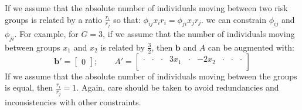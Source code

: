 If we assume that
the absolute number of individuals moving between two risk groups is
related by a ratio $\frac{r_i}{r_j}$ so that:
$\phi_{ij} x_{i} r_{i} = \phi_{ji} x_{j} r_{j}$. we can
constrain $\phi_{ij}$ and $\phi_{ji}$.				%
For example, for $G = 3$,
if we assume that the number of individuals moving between groups $x_1$ and $x_2$
is related by $\frac{3}{2}$,
then $\bm{b}$ and $A$ can be augmented with:
\begin{equation}
\bm{b}' = \left[\begin{array}{c}
0
\end{array}\right];\qquad
A' = \left[\begin{array}{ccccccccc}
\cdot & \cdot & \cdot & 3 x_1 & \cdot & -2 x_2 & \cdot & \cdot & \cdot \\
\end{array}\right] 
\end{equation}
If we assume that the absolute number of individuals moving between the groups is equal,		
then $\frac{r_i}{r_j} = 1$.		%
Again, care should be taken to avoid redundancies and inconsistencies with other constraints. %
